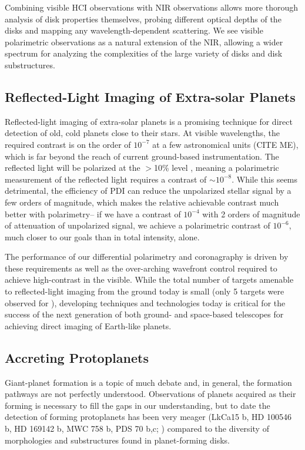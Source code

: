 Combining visible HCI observations with NIR observations allows more thorough analysis of disk properties themselves, probing different optical depths of the disks and mapping any wavelength-dependent scattering. We see visible polarimetric observations as a natural extension of the NIR, allowing a wider spectrum for analyzing the complexities of the large variety of disks and disk substructures.

\subsection{Reflected-Light Imaging of Extra-solar Planets}

Reflected-light imaging of extra-solar planets is a promising technique for direct detection of old, cold planets close to their stars. At visible wavelengths, the required contrast is on the order of $10^{-7}$ at a few astronomical units (CITE ME), which is far beyond the reach of current ground-based instrumentation. The reflected light will be polarized at the $>$10\% level \citep{hunziker_refplanets_2020}, meaning a polarimetric measurement of the reflected light requires a contrast of $\sim10^{-8}$. While this seems detrimental, the efficiency of PDI can reduce the unpolarized stellar signal by a few orders of magnitude, which makes the relative achievable contrast much better with polarimetry-- if we have a contrast of $10^{-4}$ with 2 orders of magnitude of attenuation of unpolarized signal, we achieve a polarimetric contrast of $10^{-6}$, much closer to our goals than in total intensity, alone.

The performance of our differential polarimetry and coronagraphy is driven by these requirements as well as the over-arching wavefront control required to achieve high-contrast in the visible. While the total number of targets amenable to reflected-light imaging from the ground today is small (only 5 targets were observed for \citealt{hunziker_refplanets_2020}), developing techniques and technologies today is critical for the success of the next generation of both ground- and space-based telescopes for achieving direct imaging of Earth-like planets.

\subsection{Accreting Protoplanets}

Giant-planet formation is a topic of much debate and, in general, the formation pathways are not perfectly understood. Observations of planets acquired as their forming is necessary to fill the gaps in our understanding, but to date the detection of forming protoplanets has been very meager (LkCa15 b, HD 100546 b, HD 169142 b, MWC 758 b, PDS 70 b,c; \citealp{kraus_lkca_2011,quanz_young_2013, reggiani_discovery_2014,biller_likely_2012,keppler_discovery_2018,haffert_two_2019}) compared to the diversity of morphologies and substructures found in planet-forming disks.


